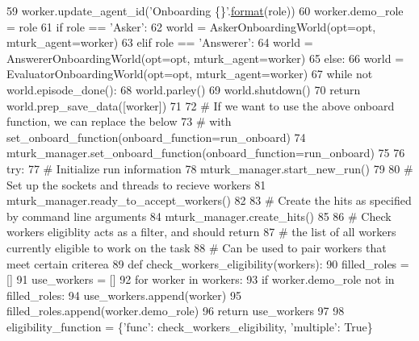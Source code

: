 \begin{DoxyCode}
59         worker.update\_agent\_id(\textcolor{stringliteral}{'Onboarding \{\}'}.\hyperlink{namespaceparlai_1_1chat__service_1_1services_1_1messenger_1_1shared__utils_a32e2e2022b824fbaf80c747160b52a76}{format}(role))
60         worker.demo\_role = role
61         \textcolor{keywordflow}{if} role == \textcolor{stringliteral}{'Asker'}:
62             world = AskerOnboardingWorld(opt=opt, mturk\_agent=worker)
63         \textcolor{keywordflow}{elif} role == \textcolor{stringliteral}{'Answerer'}:
64             world = AnswererOnboardingWorld(opt=opt, mturk\_agent=worker)
65         \textcolor{keywordflow}{else}:
66             world = EvaluatorOnboardingWorld(opt=opt, mturk\_agent=worker)
67         \textcolor{keywordflow}{while} \textcolor{keywordflow}{not} world.episode\_done():
68             world.parley()
69         world.shutdown()
70         \textcolor{keywordflow}{return} world.prep\_save\_data([worker])
71 
72     \textcolor{comment}{# If we want to use the above onboard function, we can replace the below}
73     \textcolor{comment}{# with set\_onboard\_function(onboard\_function=run\_onboard)}
74     mturk\_manager.set\_onboard\_function(onboard\_function=run\_onboard)
75 
76     \textcolor{keywordflow}{try}:
77         \textcolor{comment}{# Initialize run information}
78         mturk\_manager.start\_new\_run()
79 
80         \textcolor{comment}{# Set up the sockets and threads to recieve workers}
81         mturk\_manager.ready\_to\_accept\_workers()
82 
83         \textcolor{comment}{# Create the hits as specified by command line arguments}
84         mturk\_manager.create\_hits()
85 
86         \textcolor{comment}{# Check workers eligiblity acts as a filter, and should return}
87         \textcolor{comment}{# the list of all workers currently eligible to work on the task}
88         \textcolor{comment}{# Can be used to pair workers that meet certain criterea}
89         \textcolor{keyword}{def }check\_workers\_eligibility(workers):
90             filled\_roles = []
91             use\_workers = []
92             \textcolor{keywordflow}{for} worker \textcolor{keywordflow}{in} workers:
93                 \textcolor{keywordflow}{if} worker.demo\_role \textcolor{keywordflow}{not} \textcolor{keywordflow}{in} filled\_roles:
94                     use\_workers.append(worker)
95                     filled\_roles.append(worker.demo\_role)
96             \textcolor{keywordflow}{return} use\_workers
97 
98         eligibility\_function = \{\textcolor{stringliteral}{'func'}: check\_workers\_eligibility, \textcolor{stringliteral}{'multiple'}: \textcolor{keyword}{True}\}

\end{DoxyCode}
